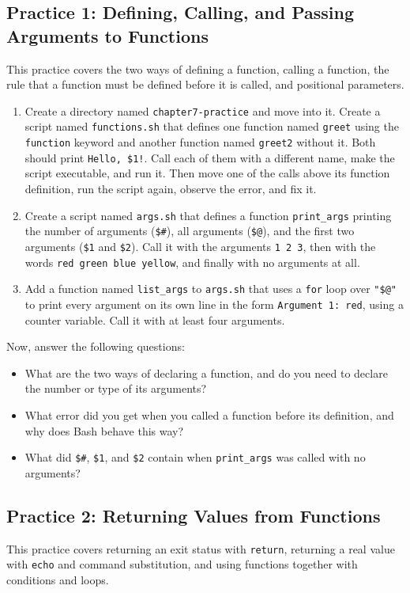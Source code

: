 \subsection{Practice 1: Defining, Calling, and Passing Arguments to Functions}
This practice covers the two ways of defining a function, calling a function, the rule that a function must be defined before it is called, and positional parameters.

\begin{enumerate}
    \item Create a directory named \texttt{chapter7-practice} and move into it. Create a script named \texttt{functions.sh} that defines one function named \texttt{greet} using the \texttt{function} keyword and another function named \texttt{greet2} without it. Both should print \texttt{Hello, \$1!}. Call each of them with a different name, make the script executable, and run it. Then move one of the calls above its function definition, run the script again, observe the error, and fix it.
    \item Create a script named \texttt{args.sh} that defines a function \texttt{print\_args} printing the number of arguments (\texttt{\$\#}), all arguments (\texttt{\$@}), and the first two arguments (\texttt{\$1} and \texttt{\$2}). Call it with the arguments \texttt{1 2 3}, then with the words \texttt{red green blue yellow}, and finally with no arguments at all.
    \item Add a function named \texttt{list\_args} to \texttt{args.sh} that uses a \texttt{for} loop over \texttt{"\$@"} to print every argument on its own line in the form \texttt{Argument 1: red}, using a counter variable. Call it with at least four arguments.
\end{enumerate}

Now, answer the following questions:
\begin{itemize}
    \item What are the two ways of declaring a function, and do you need to declare the number or type of its arguments?
    \item What error did you get when you called a function before its definition, and why does Bash behave this way?
    \item What did \texttt{\$\#}, \texttt{\$1}, and \texttt{\$2} contain when \texttt{print\_args} was called with no arguments?
\end{itemize}

\subsection{Practice 2: Returning Values from Functions}
This practice covers returning an exit status with \texttt{return}, returning a real value with \texttt{echo} and command substitution, and using functions together with conditions and loops.

